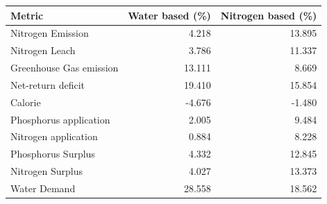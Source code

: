 \begin{tabular}{lrr}
\toprule
Metric & Water based (\%) & Nitrogen based (\%) \\
\midrule
Nitrogen Emission & 4.218 & 13.895 \\
Nitrogen Leach & 3.786 & 11.337 \\
Greenhouse Gas emission & 13.111 & 8.669 \\
Net-return deficit & 19.410 & 15.854 \\
Calorie & -4.676 & -1.480 \\
Phosphorus application & 2.005 & 9.484 \\
Nitrogen application & 0.884 & 8.228 \\
Phosphorus Surplus & 4.332 & 12.845 \\
Nitrogen Surplus & 4.027 & 13.373 \\
Water Demand & 28.558 & 18.562 \\
\bottomrule
\end{tabular}
